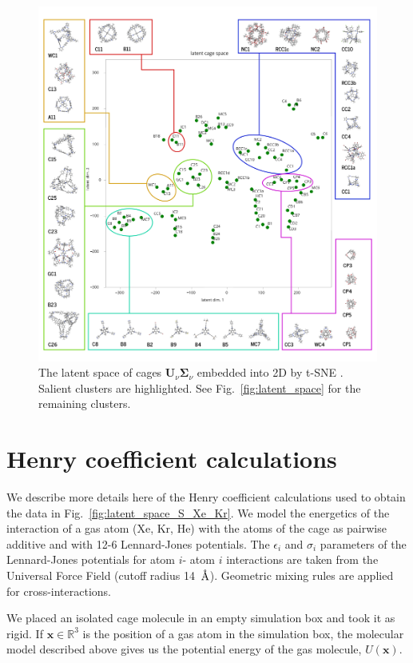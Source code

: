 \documentclass[journal=jacsat,manuscript=article]{achemso}
\newcommand{\angstrom}{\mbox{\normalfont\AA}}
\begin{document}
\begin{figure}[h!]
\centering
	\includegraphics[width=0.9\columnwidth]{../latent_cage_space_2D_marked_SI.png}
	\caption{The latent space of cages $\mathbf{U}_\nu \mathbf{\Sigma}_\nu$ embedded into 2D by t-SNE \cite{maaten2008visualizing,wattenberg2016how}. Salient clusters are highlighted. See Fig.~\ref{fig:latent_space} for the remaining clusters.
	} \label{fig:latent_space2}
\end{figure}


\newpage
\clearpage


\section{Henry coefficient calculations} \label{sec:henrydetails} We describe more details here of the Henry coefficient calculations used to obtain the data in Fig.~\ref{fig:latent_space_S_Xe_Kr}. We model the energetics of the interaction of a gas atom (Xe, Kr, He) with the atoms of the cage as pairwise additive and with 12-6 Lennard-Jones potentials. The $\epsilon_i$ and $\sigma_i$ parameters of the Lennard-Jones potentials for atom $i$- atom $i$ interactions are taken from the Universal Force Field \cite{rappe1992uff} (cutoff radius 14~$\angstrom$). Geometric mixing rules are applied for cross-interactions. 

We placed an isolated cage molecule in an empty simulation box and took it as rigid. If $\mathbf{x} \in \mathbb{R}^3$ is the position of a gas atom in the simulation box, the molecular model described above gives us the potential energy of the gas molecule, $U(\mathbf{x})$.
\end{document}
